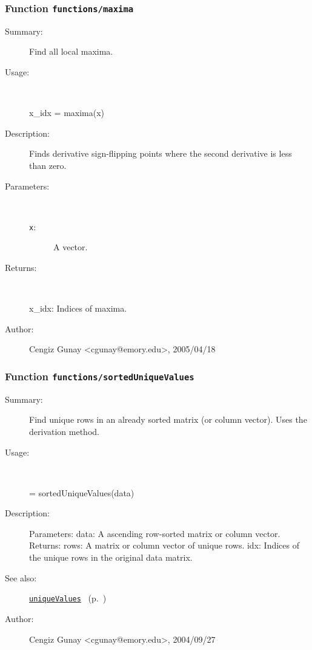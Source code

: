 \subsubsection[Function \texttt{maxima}]{Function \texttt{functions/maxima}}%
%
\label{ref_functions__maxima}%
\hypertarget{ref_functions__maxima}{}%
\begin{description}
\item[Summary:]Find all local maxima.
%
\item[Usage:]~%
\begin{lyxcode}%
x\_idx = maxima(x)
%
\end{lyxcode}%
%
\item[Description:]%
Finds derivative sign-flipping points where the second derivative is 
 less than zero.
\item[Parameters:]~
\begin{description}%
\item[\texttt{x}:]
 A vector.
\end{description}%
%
\item[Returns:]~

 	x\_idx: Indices of maxima.
%
%
%
\item[Author:]%
Cengiz Gunay <cgunay@emory.edu>, 2005/04/18%
\end{description}
\methodline%
\subsubsection[Function \texttt{sortedUniqueValues}]{Function \texttt{functions/sortedUniqueValues}}%
%
\label{ref_functions__sortedUniqueValues}%
\hypertarget{ref_functions__sortedUniqueValues}{}%
\begin{description}
\item[Summary:]Find unique rows in an already sorted matrix 
			(or column vector). Uses the derivation method.
%
\item[Usage:]~%
\begin{lyxcode}%
[rows, idx] = sortedUniqueValues(data)
%
\end{lyxcode}%
%
\item[Description:]%
Parameters:
		data: A ascending row-sorted matrix or column vector.
	Returns:
		rows: A matrix or column vector of unique rows.
		idx: Indices of the unique rows in the original data matrix.
%
%
%
\item[See also:]%
\hyperlink{ref_uniqueValues}{\texttt{uniqueValues}}%
\ (p.~\pageref{ref_uniqueValues})%
%
%
\item[Author:]%
Cengiz Gunay <cgunay@emory.edu>, 2004/09/27%
\end{description}
\methodline%
